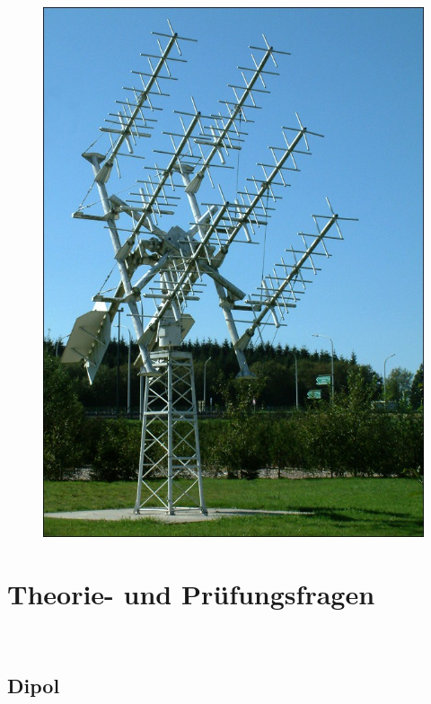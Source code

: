 \begin{figure}
 \vspace{-6cm}
  \includegraphics[scale=0.2]{Antennen/Bilder/Kreuzdipolarp.jpg}
 \vspace{-6cm}
\end{figure}

\section*{Theorie- und Prüfungsfragen}

~~~~~~

\subsection*{Dipol}

